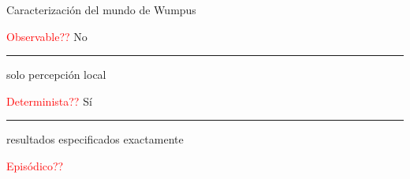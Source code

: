 \begin{frame}{Caracterización del mundo de Wumpus}
    
    \textcolor{red}{Observable??} No \noindent\rule{0.3cm}{0.7pt} solo percepción local
    \bigskip
    
    \textcolor{red}{Determinista??} Sí \noindent\rule{0.3cm}{0.7pt} resultados especificados exactamente
    \bigskip
    
    \textcolor{red}{Episódico??}
    
\end{frame}